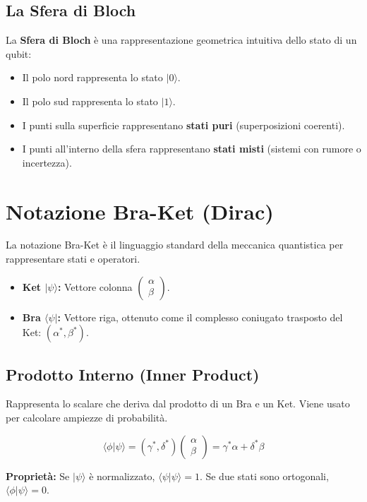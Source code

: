 \documentclass[12pt, a4paper]{article}
\begin{document}
\subsection{La Sfera di Bloch}
La \textbf{Sfera di Bloch} è una rappresentazione geometrica intuitiva dello stato di un qubit:
\begin{itemize}
    \item Il polo nord rappresenta lo stato $|0\rangle$.
    \item Il polo sud rappresenta lo stato $|1\rangle$.
    \item I punti sulla superficie rappresentano \textbf{stati puri} (superposizioni coerenti).
    \item I punti all'interno della sfera rappresentano \textbf{stati misti} (sistemi con rumore o incertezza).
\end{itemize}

\section{Notazione Bra-Ket (Dirac)}
La notazione Bra-Ket è il linguaggio standard della meccanica quantistica per rappresentare stati e operatori.

\begin{itemize}
    \item \textbf{Ket $|\psi\rangle$:} Vettore colonna $\begin{pmatrix} \alpha \\ \beta \end{pmatrix}$.
    \item \textbf{Bra $\langle\psi|$:} Vettore riga, ottenuto come il complesso coniugato trasposto del Ket: $(\alpha^*, \beta^*)$.
\end{itemize}

\subsection{Prodotto Interno (Inner Product)}
Rappresenta lo scalare che deriva dal prodotto di un Bra e un Ket. Viene usato per calcolare ampiezze di probabilità.
\begin{tcolorbox}
\[
\langle\phi|\psi\rangle = (\gamma^*, \delta^*) \begin{pmatrix} \alpha \\ \beta \end{pmatrix} = \gamma^*\alpha + \delta^*\beta
\]
\end{tcolorbox}
\textbf{Proprietà:} Se $|\psi\rangle$ è normalizzato, $\langle\psi|\psi\rangle = 1$. Se due stati sono ortogonali, $\langle\phi|\psi\rangle = 0$.
\end{document}
